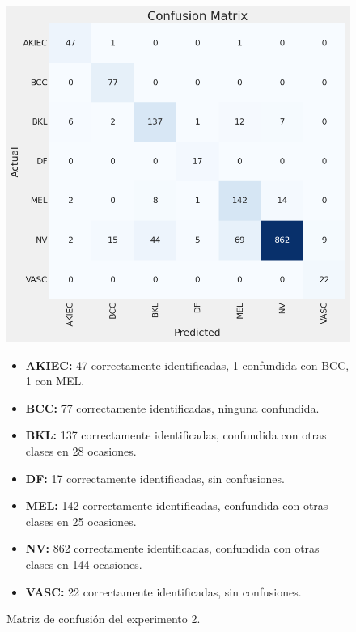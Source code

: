 \begin{figure}[H]
   \small
   \begin{minipage}{0.45\textwidth}
       \centering
       \includegraphics[width=\linewidth]{./Graphics/confussionmatrix_p3.png}
       \caption{Matriz de confusión del experimento 2.}
       \label{fig:confussion_matrix_e3}
   \end{minipage}%
   \begin{minipage}{0.55\textwidth} 
      \small
       \begin{itemize}
         \item \textbf{AKIEC:} 47 correctamente identificadas, 1 confundida con BCC, 1 con MEL.
         \item \textbf{BCC:} 77 correctamente identificadas, ninguna confundida.
         \item \textbf{BKL:} 137 correctamente identificadas, confundida con otras clases en 28 ocasiones.
         \item \textbf{DF:} 17 correctamente identificadas, sin confusiones.
         \item \textbf{MEL:} 142 correctamente identificadas, confundida con otras clases en 25 ocasiones.
         \item \textbf{NV:} 862 correctamente identificadas, confundida con otras clases en 144 ocasiones.
         \item \textbf{VASC:} 22 correctamente identificadas, sin confusiones.
       \end{itemize}
   \end{minipage}
\end{figure}

